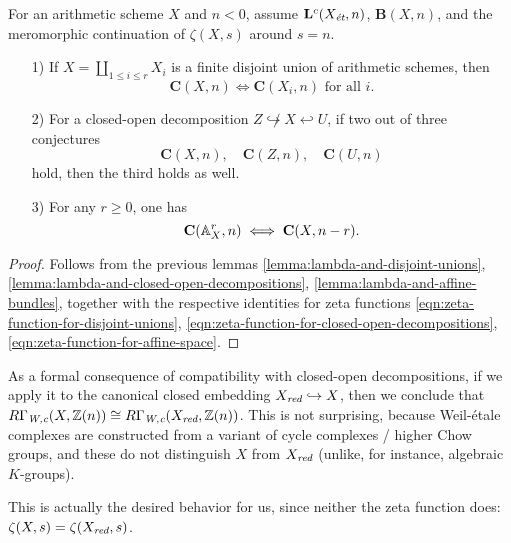 \documentclass{article}
\numberwithin{equation}{section}
\begin{document}
\begin{theorem}
  \label{thm:compatibility-of-C(X,n)}
  For an arithmetic scheme $X$ and $n < 0$, assume $\mathbf{L}^c (X_\et,n)$,
  $\mathbf{B} (X,n)$, and the meromorphic continuation of $\zeta (X,s)$ around
  $s = n$.

  \begin{enumerate}
  \item[1)] If $X = \coprod_{1 \le i \le r} X_i$ is a finite disjoint union of
    arithmetic schemes, then
    $$\mathbf{C} (X,n) \iff \mathbf{C} (X_i,n)\text{ for all }i.$$

  \item[2)] For a closed-open decomposition
    $Z \not\hookrightarrow X \hookleftarrow U$, if two out of three conjectures
    \[ \mathbf{C} (X,n), \quad
      \mathbf{C} (Z,n), \quad
      \mathbf{C} (U,n) \]
    hold, then the third holds as well.

  \item[3)] For any $r \ge 0$, one has
    $$\mathbf{C} (\AA^r_X, n) \iff \mathbf{C} (X, n-r).$$
  \end{enumerate}

  \begin{proof}
    Follows from the previous lemmas
    \ref{lemma:lambda-and-disjoint-unions},
    \ref{lemma:lambda-and-closed-open-decompositions},
    \ref{lemma:lambda-and-affine-bundles},
    together with the respective identities for zeta functions
    \eqref{eqn:zeta-function-for-disjoint-unions},
    \eqref{eqn:zeta-function-for-closed-open-decompositions},
    \eqref{eqn:zeta-function-for-affine-space}.
  \end{proof}
\end{theorem}

\begin{remark}
  As a formal consequence of compatibility with closed-open decompositions, if
  we apply it to the canonical closed embedding $X_\red \hookrightarrow X$,
  then we conclude that
  $R\Gamma_\Wc (X, \ZZ(n)) \cong R\Gamma_\Wc (X_\red, \ZZ(n))$. This is not
  surprising, because Weil-étale complexes are constructed from a variant of
  cycle complexes / higher Chow groups, and these do not distinguish $X$ from
  $X_\red$ (unlike, for instance, algebraic $K$-groups).

  This is actually the desired behavior for us, since neither the zeta function
  does: $\zeta (X,s) = \zeta (X_\red,s)$.
\end{remark}
\end{document}
